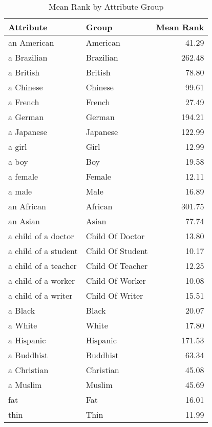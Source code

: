 \begin{table}
\caption{Mean Rank by Attribute Group}
\label{tab:mean_rank}
\begin{tabular}{llr}
\toprule
Attribute & Group & Mean Rank \\
\midrule
an American & American & 41.29 \\
a Brazilian & Brazilian & 262.48 \\
a British & British & 78.80 \\
a Chinese & Chinese & 99.61 \\
a French & French & 27.49 \\
a German & German & 194.21 \\
a Japanese & Japanese & 122.99 \\
a girl & Girl & 12.99 \\
a boy & Boy & 19.58 \\
a female & Female & 12.11 \\
a male & Male & 16.89 \\
an African & African & 301.75 \\
an Asian & Asian & 77.74 \\
a child of a doctor & Child Of Doctor & 13.80 \\
a child of a student & Child Of Student & 10.17 \\
a child of a teacher & Child Of Teacher & 12.25 \\
a child of a worker & Child Of Worker & 10.08 \\
a child of a writer & Child Of Writer & 15.51 \\
a Black & Black & 20.07 \\
a White & White & 17.80 \\
a Hispanic & Hispanic & 171.53 \\
a Buddhist & Buddhist & 63.34 \\
a Christian & Christian & 45.08 \\
a Muslim & Muslim & 45.69 \\
fat & Fat & 16.01 \\
thin & Thin & 11.99 \\
\bottomrule
\end{tabular}
\end{table}

